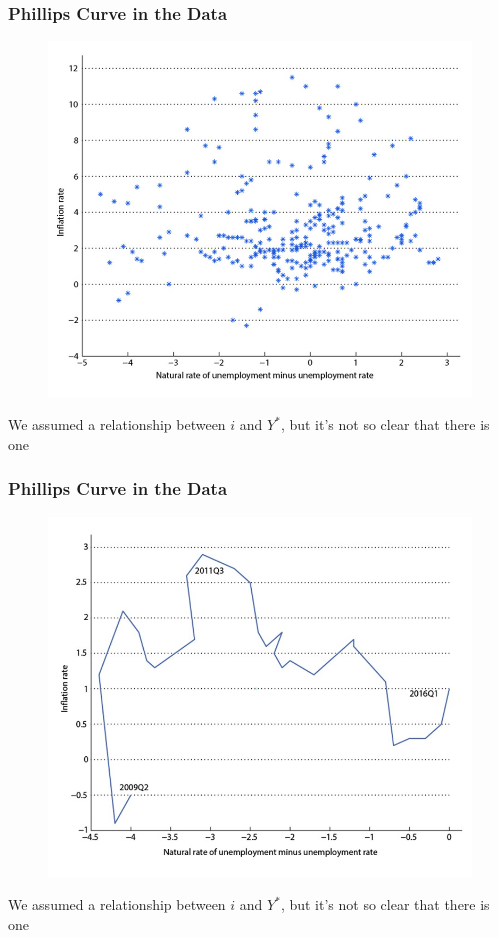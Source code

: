 \documentclass{beamer}
\begin{document}
\begin{frame}
\frametitle[alignment=center]{Phillips Curve in the Data}
\begin{figure}
\centering
\includegraphics[scale=0.5]{Figures/W_Fig_15pt4.png}
\end{figure}
We assumed a relationship between $i$ and $Y^*$, but it's not so clear that there is one
\end{frame}



\begin{frame}
\frametitle[alignment=center]{Phillips Curve in the Data}
\begin{figure}
\centering
\includegraphics[scale=0.5]{Figures/W_Fig_15pt5.png}
\end{figure}
We assumed a relationship between $i$ and $Y^*$, but it's not so clear that there is one
\end{frame}
\end{document}
